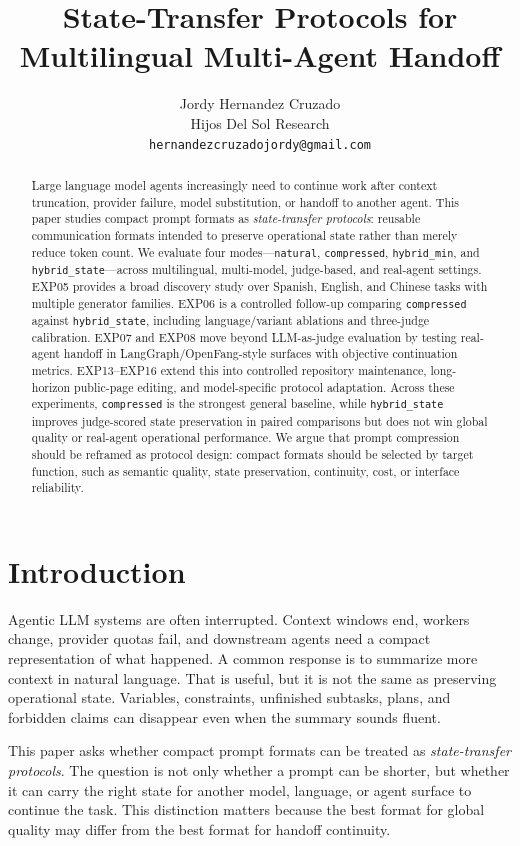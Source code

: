 \documentclass[11pt]{article}
\title{State-Transfer Protocols for Multilingual Multi-Agent Handoff}
\author{Jordy Hernandez Cruzado\\Hijos Del Sol Research\\\texttt{hernandezcruzadojordy@gmail.com}}
\date{}
\begin{document}
\maketitle

\begin{abstract}
Large language model agents increasingly need to continue work after context truncation, provider failure, model substitution, or handoff to another agent. This paper studies compact prompt formats as \emph{state-transfer protocols}: reusable communication formats intended to preserve operational state rather than merely reduce token count. We evaluate four modes---\texttt{natural}, \texttt{compressed}, \texttt{hybrid\_min}, and \texttt{hybrid\_state}---across multilingual, multi-model, judge-based, and real-agent settings. EXP05 provides a broad discovery study over Spanish, English, and Chinese tasks with multiple generator families. EXP06 is a controlled follow-up comparing \texttt{compressed} against \texttt{hybrid\_state}, including language/variant ablations and three-judge calibration. EXP07 and EXP08 move beyond LLM-as-judge evaluation by testing real-agent handoff in LangGraph/OpenFang-style surfaces with objective continuation metrics. EXP13--EXP16 extend this into controlled repository maintenance, long-horizon public-page editing, and model-specific protocol adaptation. Across these experiments, \texttt{compressed} is the strongest general baseline, while \texttt{hybrid\_state} improves judge-scored state preservation in paired comparisons but does not win global quality or real-agent operational performance. We argue that prompt compression should be reframed as protocol design: compact formats should be selected by target function, such as semantic quality, state preservation, continuity, cost, or interface reliability.
\end{abstract}

\section{Introduction}
Agentic LLM systems are often interrupted. Context windows end, workers change, provider quotas fail, and downstream agents need a compact representation of what happened. A common response is to summarize more context in natural language. That is useful, but it is not the same as preserving operational state. Variables, constraints, unfinished subtasks, plans, and forbidden claims can disappear even when the summary sounds fluent.

This paper asks whether compact prompt formats can be treated as \emph{state-transfer protocols}. The question is not only whether a prompt can be shorter, but whether it can carry the right state for another model, language, or agent surface to continue the task. This distinction matters because the best format for global quality may differ from the best format for handoff continuity.
\end{document}
